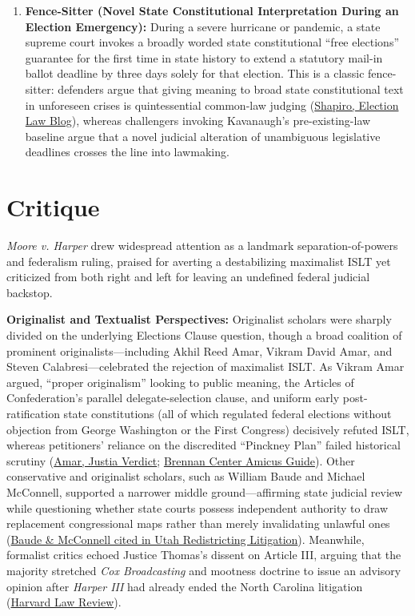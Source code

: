\documentclass[12pt]{article}
\begin{document}
\begin{enumerate}
\item \textbf{Fence-Sitter (Novel State Constitutional Interpretation During an Election Emergency):} During a severe hurricane or pandemic, a state supreme court invokes a broadly worded state constitutional ``free elections'' guarantee for the first time in state history to extend a statutory mail-in ballot deadline by three days solely for that election. This is a classic fence-sitter: defenders argue that giving meaning to broad state constitutional text in unforeseen crises is quintessential common-law judging (\href{https://electionlawblog.org/2023/carolyn-shapiro-moore-v-harper-and-state-courts/}{Shapiro, Election Law Blog}), whereas challengers invoking Kavanaugh's pre-existing-law baseline argue that a novel judicial alteration of unambiguous legislative deadlines crosses the line into lawmaking.
\end{enumerate}

\section{Critique}
\textit{Moore v. Harper} drew widespread attention as a landmark separation-of-powers and federalism ruling, praised for averting a destabilizing maximalist ISLT yet criticized from both right and left for leaving an undefined federal judicial backstop.

\textbf{Originalist and Textualist Perspectives:} Originalist scholars were sharply divided on the underlying Elections Clause question, though a broad coalition of prominent originalists---including Akhil Reed Amar, Vikram David Amar, and Steven Calabresi---celebrated the rejection of maximalist ISLT. As Vikram Amar argued, ``proper originalism'' looking to public meaning, the Articles of Confederation's parallel delegate-selection clause, and uniform early post-ratification state constitutions (all of which regulated federal elections without objection from George Washington or the First Congress) decisively refuted ISLT, whereas petitioners' reliance on the discredited ``Pinckney Plan'' failed historical scrutiny (\href{https://verdict.justia.com/2022/11/09/what-the-isl-moore-v-harper-case-can-tell-us-about-principled-originalism}{Amar, Justia Verdict}; \href{https://www.brennancenter.org/our-work/court-cases/annotated-guide-amicus-briefs-moore-v-harper}{Brennan Center Amicus Guide}). Other conservative and originalist scholars, such as William Baude and Michael McConnell, supported a narrower middle ground---affirming state judicial review while questioning whether state courts possess independent authority to draw replacement congressional maps rather than merely invalidating unlawful ones (\href{https://redistricting.lls.edu/wp-content/uploads/UT-gardner-20260214-mtd-opp.pdf}{Baude \& McConnell cited in Utah Redistricting Litigation}). Meanwhile, formalist critics echoed Justice Thomas's dissent on Article III, arguing that the majority stretched \textit{Cox Broadcasting} and mootness doctrine to issue an advisory opinion after \textit{Harper III} had already ended the North Carolina litigation (\href{https://harvardlawreview.org/print/vol-137/moore-v-harper/}{Harvard Law Review}).
\end{document}
